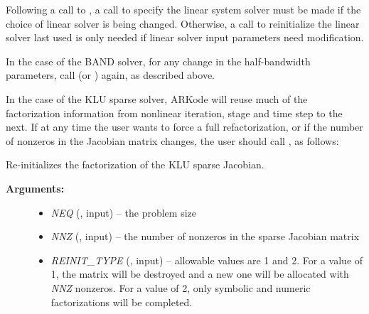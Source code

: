 \documentclass[letterpaper,10pt,english]{sphinxmanual}
\begin{document}
Following a call to {\hyperref[f_interface/Usage:f/_/FARKREINIT]{\emph{}}}, a call to specify the
linear system solver must be made if the choice of linear solver is
being changed.  Otherwise, a call to reinitialize the linear solver
last used is only needed if linear solver input parameters need
modification.

In the case of the BAND solver, for any change in the
half-bandwidth parameters, call {\hyperref[f_interface/Usage:f/_/FARKBAND]{\emph{}}} (or
{\hyperref[f_interface/Usage:f/_/FARKLAPACKBAND]{\emph{}}}) again, as described above.

In the case of the KLU sparse solver, ARKode will reuse much of the
factorization information from nonlinear iteration, stage and time
step to the next.  If at any time the user wants to force a full
refactorization, or if the number of nonzeros in the Jacobian matrix
changes, the user should call {\hyperref[f_interface/Usage:f/_/FARKKLUREINIT]{\emph{}}}, as follows:

\begin{fulllineitems}
\label{f_interface/Usage:f/_/FARKKLUREINIT}
Re-initializes the factorization of the KLU sparse Jacobian.
\begin{description}
\item[{\textbf{Arguments:}}] \leavevmode\begin{itemize}
\item {} 
\emph{NEQ} (, input) -- the problem size

\item {} 
\emph{NNZ} (, input) -- the number of nonzeros in the
sparse Jacobian matrix

\item {} 
\emph{REINIT\_TYPE} (, input) -- allowable values are 1
and 2.  For a value of 1, the matrix will be destroyed and a
new one will be allocated with \emph{NNZ} nonzeros.  For a value of
2, only symbolic and numeric factorizations will be completed.

\end{itemize}

\end{description}

\end{fulllineitems}
\end{document}

